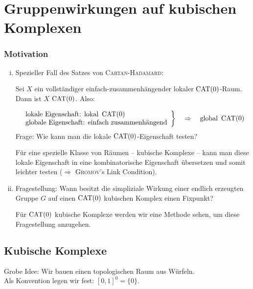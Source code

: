 \chapter{Gruppenwirkungen auf kubischen Komplexen} %
\label{cha:3}

\subsection*{Motivation}
\begin{enumerate}[(i)]
	\item Spezieller Fall des Satzes von \textsc{Cartan-Hadamard}: 
	
	Sei $X$ ein vollständiger einfach-zusammenhängender lokaler $\operatorname{CAT(0)}$-Raum.
	Dann ist $X$ $\operatorname{CAT(0)}$. Also:
	
	\[
		\left. \begin{array}{l}
			\text{lokale Eigenschaft: lokal } \operatorname{CAT(0)} \\
			\text{globale Eigenschaft: einfach zusammenhängend}
		\end{array} \right\} \quad \Rightarrow \quad \text{global } \operatorname{CAT(0)}
	\]
	Frage: Wie kann man die lokale $\operatorname{CAT(0)}$-Eigenschaft testen?
	
	Für eine spezielle Klasse von Räumen -- kubische Komplexe -- kann man diese lokale Eigenschaft in eine kombinatorische Eigenschaft übersetzen und somit leichter testen ($\Rightarrow$ \textsc{Gromov}'s Link Condition).
	\item Fragestellung: Wann besitzt die simpliziale Wirkung einer endlich erzeugten Gruppe $G$ auf einen $\operatorname{CAT(0)}$ kubischen Komplex einen Fixpunkt?
	
	Für $\operatorname{CAT(0)}$ kubische Komplexe werden wir eine Methode sehen, um diese Fragestellung anzugehen.
\end{enumerate}

\section{Kubische Komplexe}
\label{sec:3.1}
	Grobe Idee: Wir bauen einen topologischen Raum aus Würfeln.\\
	Als Konvention legen wir fest: $[0,1]^0 = \{0\}$.
	
